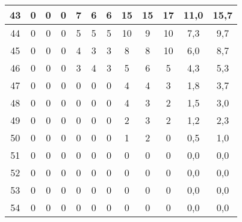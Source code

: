 \begin{center}
\begin{longtable}{|c|c|c|c|c|c|c|c|c|c|c|c|}
		43 & 0 & 0 & 0 & 7  & 6  & 6  & 15  & 15  & 17  & 11,0     & 15,7   \\ \hline
		44 & 0 & 0 & 0 & 5  & 5  & 5  & 10  & 9   & 10  & 7,3      & 9,7    \\ \hline
		45 & 0 & 0 & 0 & 4  & 3  & 3  & 8   & 8   & 10  & 6,0      & 8,7    \\ \hline
		46 & 0 & 0 & 0 & 3  & 4  & 3  & 5   & 6   & 5   & 4,3      & 5,3    \\ \hline
		47 & 0 & 0 & 0 & 0  & 0  & 0  & 4   & 4   & 3   & 1,8      & 3,7    \\ \hline
		48 & 0 & 0 & 0 & 0  & 0  & 0  & 4   & 3   & 2   & 1,5      & 3,0    \\ \hline
		49 & 0 & 0 & 0 & 0  & 0  & 0  & 2   & 3   & 2   & 1,2      & 2,3    \\ \hline
		50 & 0 & 0 & 0 & 0  & 0  & 0  & 1   & 2   & 0   & 0,5      & 1,0    \\ \hline
		51 & 0 & 0 & 0 & 0  & 0  & 0  & 0   & 0   & 0   & 0,0      & 0,0    \\ \hline
		52 & 0 & 0 & 0 & 0  & 0  & 0  & 0   & 0   & 0   & 0,0      & 0,0    \\ \hline
		53 & 0 & 0 & 0 & 0  & 0  & 0  & 0   & 0   & 0   & 0,0      & 0,0    \\ \hline
		54 & 0 & 0 & 0 & 0  & 0  & 0  & 0   & 0   & 0   & 0,0      & 0,0    \\ \hline
	\end{longtable}
\end{center}



